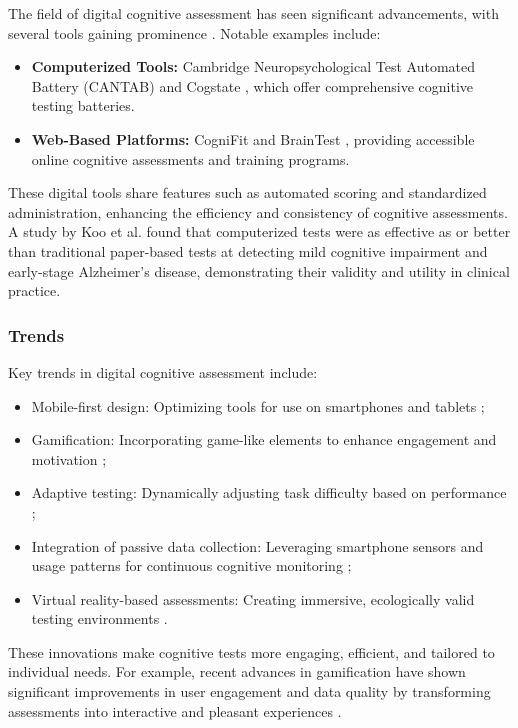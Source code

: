 The field of digital cognitive assessment has seen significant advancements, with several tools gaining prominence \cite{Wild2021}. Notable examples include:
\begin{itemize}
    \item \textbf{Computerized Tools:} Cambridge Neuropsychological Test Automated Battery (CANTAB) \cite{Sandberg2011} and Cogstate \cite{Farnsworth2017}, which offer comprehensive cognitive testing batteries.
    \item \textbf{Web-Based Platforms:} CogniFit \cite{Cognifit2024} and BrainTest \cite{Braintest2024}, providing accessible online cognitive assessments and training programs.
\end{itemize}
These digital tools share features such as automated scoring and standardized administration, enhancing the efficiency and consistency of cognitive assessments. A study by Koo et al. \cite{Koo2022} found that computerized tests were as effective as or better than traditional paper-based tests at detecting mild cognitive impairment and early-stage Alzheimer's disease, demonstrating their validity and utility in clinical practice.

\subsubsection{Trends}
Key trends in digital cognitive assessment include:
\begin{itemize}
    \item Mobile-first design: Optimizing tools for use on smartphones and tablets \cite{Zygouris2017};
    \item Gamification: Incorporating game-like elements to enhance engagement and motivation \cite{Lumsden2016};
    \item Adaptive testing: Dynamically adjusting task difficulty based on performance \cite{Finkelman2016};
    \item Integration of passive data collection: Leveraging smartphone sensors and usage patterns for continuous cognitive monitoring \cite{Dagum2018};
    \item Virtual reality-based assessments: Creating immersive, ecologically valid testing environments \cite{Parsons2018}.
\end{itemize}
These innovations make cognitive tests more engaging, efficient, and tailored to individual needs. For example, recent advances in gamification have shown significant improvements in user engagement and data quality by transforming assessments into interactive and pleasant experiences \cite{Bowers2021}.


